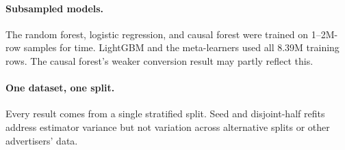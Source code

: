 \paragraph{Subsampled models.} The random forest, logistic regression, and
causal forest were trained on 1--2M-row samples for time. LightGBM and the
meta-learners used all 8.39M training rows. The causal forest's weaker
conversion result may partly reflect this.

\paragraph{One dataset, one split.} Every result comes from a single
stratified split. Seed and disjoint-half refits address estimator variance
but not variation across alternative splits or other advertisers' data.
